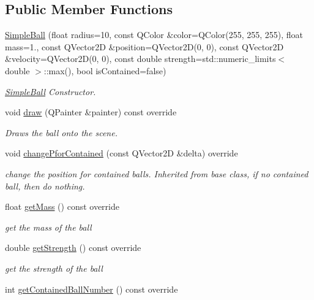 \subsection*{Public Member Functions}
\begin{DoxyCompactItemize}
\item 
\mbox{\hyperlink{class_simple_ball_a73986d31758ab1201000aef11bef49aa}{Simple\+Ball}} (float radius=10, const Q\+Color \&color=Q\+Color(255, 255, 255), float mass=1., const Q\+Vector2D \&position=Q\+Vector2D(0, 0), const Q\+Vector2D \&velocity=Q\+Vector2D(0, 0), const double strength=std\+::numeric\+\_\+limits$<$ double $>$\+::max(), bool is\+Contained=false)
\begin{DoxyCompactList}\small\item\em \mbox{\hyperlink{class_simple_ball}{Simple\+Ball}} Constructor. \end{DoxyCompactList}\item 
void \mbox{\hyperlink{class_simple_ball_ad775dddec77276d6f92f8aea4b487df3}{draw}} (Q\+Painter \&painter) const override
\begin{DoxyCompactList}\small\item\em Draws the ball onto the scene. \end{DoxyCompactList}\item 
void \mbox{\hyperlink{class_simple_ball_a22ec99de5d096383f869a919f9f9abd7}{change\+Pfor\+Contained}} (const Q\+Vector2D \&delta) override
\begin{DoxyCompactList}\small\item\em change the position for contained balls. Inherited from base class, if no contained ball, then do nothing. \end{DoxyCompactList}\item 
float \mbox{\hyperlink{class_simple_ball_a0cb0b931a2e3fa9f2ffba6fd354985ea}{get\+Mass}} () const override
\begin{DoxyCompactList}\small\item\em get the mass of the ball \end{DoxyCompactList}\item 
double \mbox{\hyperlink{class_simple_ball_a3a4c5bc776e3788112f02320432ba8cc}{get\+Strength}} () const override
\begin{DoxyCompactList}\small\item\em get the strength of the ball \end{DoxyCompactList}\item 
int \mbox{\hyperlink{class_simple_ball_ac9c7e389cf03bfb2f3e71d66bf6608cd}{get\+Contained\+Ball\+Number}} () const override

\end{DoxyCompactItemize}
